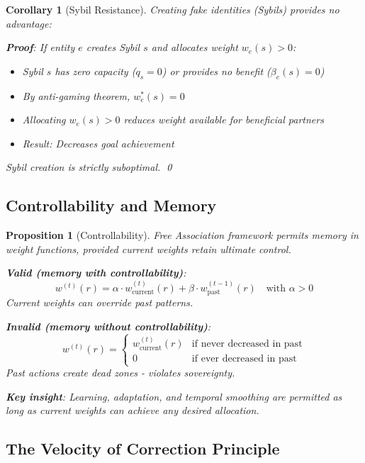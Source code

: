 \documentclass[11pt]{article}
\newtheorem{proposition}{Proposition}
\newtheorem{corollary}{Corollary}
\begin{document}
\begin{corollary}[Sybil Resistance]
Creating fake identities (Sybils) provides no advantage:

\textbf{Proof}: If entity $e$ creates Sybil $s$ and allocates weight $w_e(s) > 0$:
\begin{itemize}
\item Sybil $s$ has zero capacity ($q_s = 0$) or provides no benefit ($\beta_e(s) = 0$)
\item By anti-gaming theorem, $w_e^*(s) = 0$
\item Allocating $w_e(s) > 0$ reduces weight available for beneficial partners
\item Result: Decreases goal achievement
\end{itemize}

Sybil creation is strictly suboptimal. \qed
\end{corollary}

\subsection{Controllability and Memory}

\begin{proposition}[Controllability]
\label{prop:controllability-commons}
Free Association framework permits memory in weight functions, provided current weights retain ultimate control.

\textbf{Valid (memory with controllability)}:
\[
w^{(t)}(r) = \alpha \cdot w_{\text{current}}^{(t)}(r) + \beta \cdot w_{\text{past}}^{(t-1)}(r) \quad \text{with } \alpha > 0
\]
Current weights can override past patterns.

\textbf{Invalid (memory without controllability)}:
\[
w^{(t)}(r) = \begin{cases}
w_{\text{current}}^{(t)}(r) & \text{if never decreased in past} \\
0 & \text{if ever decreased in past}
\end{cases}
\]
Past actions create dead zones - violates sovereignty.

\textbf{Key insight}: Learning, adaptation, and temporal smoothing are permitted as long as current weights can achieve any desired allocation.
\end{proposition}

\subsection{The Velocity of Correction Principle}
\end{document}
